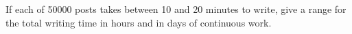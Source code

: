 If each of 50000 posts takes between 10 and 20 minutes to write, give a range for the total writing time in hours and in days of continuous work.
